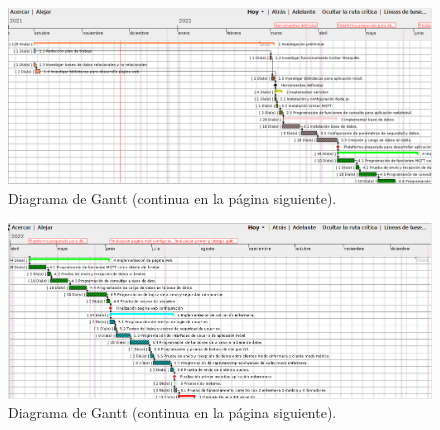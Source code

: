 \documentclass[
11pt, %
]{charter}
\begin{document}



\begin{landscape}
\begin{figure}[htpb]
\centering 
\includegraphics[height=.60\textheight]{./Figuras/planning1.png}
\caption{Diagrama de Gantt (continua en la página siguiente).}
\label{fig:diagGantt}
\end{figure}
\end{landscape}


\newpage
\begin{landscape}
\begin{figure}[htpb]
\centering 
\includegraphics[height=.60\textheight]{./Figuras/planning2.png}
\caption{Diagrama de Gantt (continua en la página siguiente).}
\label{fig:diagGantt2}
\end{figure}
\end{landscape}
\end{document}

